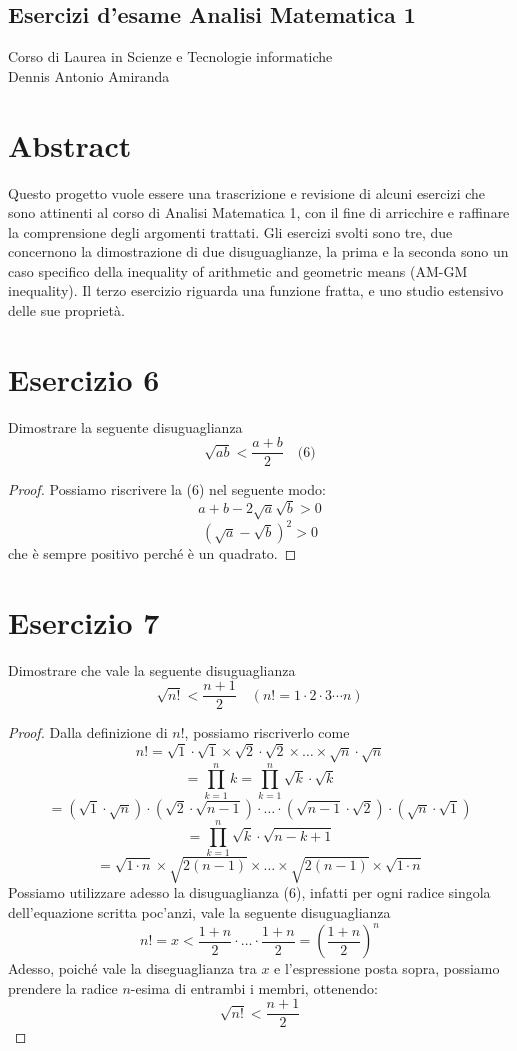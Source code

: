 \documentclass{article}
\begin{document}
\begin{center}
\section*{Esercizi d’esame Analisi Matematica 1}
Corso di Laurea in Scienze e Tecnologie informatiche\\
Dennis Antonio Amiranda
\end{center}

\section*{Abstract  }
Questo progetto vuole essere una trascrizione e revisione di alcuni esercizi che sono attinenti al corso di Analisi Matematica 1, con il fine di arricchire e raffinare la comprensione degli argomenti trattati. Gli esercizi svolti sono tre, due concernono la dimostrazione di due disuguaglianze, la prima e la seconda sono un caso specifico della inequality of arithmetic and geometric means (AM-GM inequality). Il terzo esercizio riguarda una funzione fratta, e uno studio estensivo delle sue proprietà.

\section*{Esercizio 6}
Dimostrare la seguente disuguaglianza
\[
\sqrt{ab} < \frac{a+b}{2} \quad \text{(6)}
\]
\begin{proof}
    Possiamo riscrivere la (6) nel seguente modo:
    \[
    a + b - 2\sqrt{a}\sqrt{b} > 0
    \]
    \[
    (\sqrt{a} - \sqrt{b})^2 > 0
    \]
    che è sempre positivo perché è un quadrato.
\end{proof}

\section*{Esercizio 7}
Dimostrare che vale la seguente disuguaglianza
\[
\sqrt{n!} < \frac{n+1}{2} \quad (n! = 1 \cdot 2 \cdot 3 \cdots n)
\]
\begin{proof}
    Dalla definizione di \(n!\), possiamo riscriverlo come
    \[
    n! = \sqrt{1} \cdot \sqrt{1} \times \sqrt{2} \cdot \sqrt{2} \times \ldots \times \sqrt{n} \cdot \sqrt{n}
    \]
    \[
    = \prod_{k=1}^{n} k = \prod_{k=1}^{n} \sqrt{k} \cdot \sqrt{k}
    \]
    \[
    = (\sqrt{1} \cdot \sqrt{n}) \cdot (\sqrt{2} \cdot \sqrt{n-1}) \cdot \ldots \cdot (\sqrt{n-1} \cdot \sqrt{2}) \cdot (\sqrt{n} \cdot \sqrt{1})
    \]
    \[
    = \prod_{k=1}^{n} \sqrt{k} \cdot \sqrt{n-k+1}
    \]
    \[
    = \sqrt{1 \cdot n} \times \sqrt{2(n-1)} \times \ldots \times \sqrt{2(n-1)} \times \sqrt{1 \cdot n} 
    \]
    Possiamo utilizzare adesso la disuguaglianza (6), infatti per ogni radice singola dell’equazione scritta poc’anzi, vale la seguente disuguaglianza
    \[
    n! = x < \frac{1+n}{2} \cdot \ldots \cdot \frac{1+n}{2} = \left(\frac{1+n}{2}\right)^n
    \]
    Adesso, poiché vale la diseguaglianza tra \(x\) e l’espressione posta sopra, possiamo prendere la radice \(n\)-esima di entrambi i membri, ottenendo:
    \[
    \sqrt{n!} < \frac{n+1}{2}
    \]
\end{proof}
\end{document}
